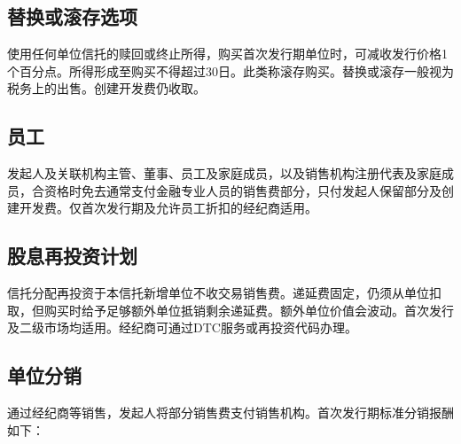 \documentclass[UTF8,fontset=none,11pt,a4paper]{ctexart}
\begin{document}
\subsection*{替换或滚存选项}
使用任何单位信托的赎回或终止所得，购买首次发行期单位时，可减收发行价格1个百分点。所得形成至购买不得超过30日。此类称滚存购买。替换或滚存一般视为税务上的出售。创建开发费仍收取。


\subsection*{员工}
发起人及关联机构主管、董事、员工及家庭成员，以及销售机构注册代表及家庭成员，合资格时免去通常支付金融专业人员的销售费部分，只付发起人保留部分及创建开发费。仅首次发行期及允许员工折扣的经纪商适用。


\subsection*{股息再投资计划}
信托分配再投资于本信托新增单位不收交易销售费。递延费固定，仍须从单位扣取，但购买时给予足够额外单位抵销剩余递延费。额外单位价值会波动。首次发行及二级市场均适用。经纪商可通过DTC服务或再投资代码办理。


\subsection*{单位分销}
通过经纪商等销售，发起人将部分销售费支付销售机构。首次发行期标准分销报酬如下：
\end{document}
